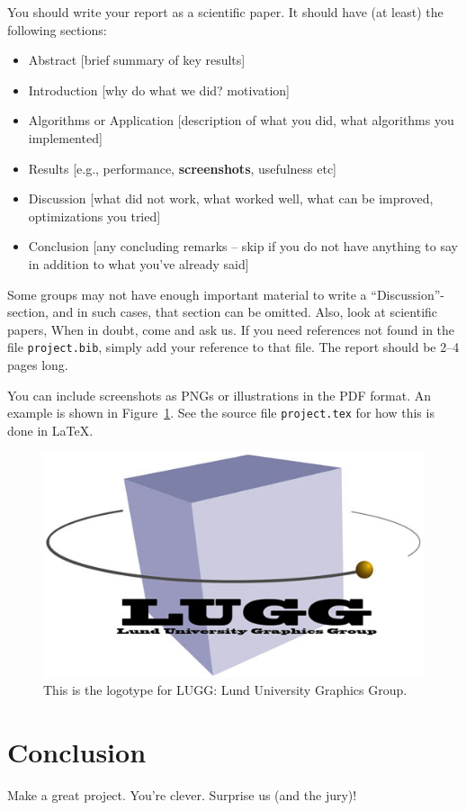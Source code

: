 \documentclass{acmsiggraph}               %
\begin{document}
You should write your report as a scientific paper. It should have (at least)
the following sections:
\begin{itemize}
    \item Abstract [brief summary of key results]
    \item Introduction [why do what we did? motivation]
    \item Algorithms or Application [description of what you did, what algorithms you implemented]
    \item Results [e.g., performance, \textbf{screenshots}, usefulness etc]
    \item Discussion [what did not work, what worked well, what can be improved, optimizations you tried]
    \item Conclusion [any concluding remarks -- skip if you do not have anything to say in addition to what you've already said]
\end{itemize}
Some groups may not have enough important material to write a ``Discussion''-section,
and in such cases, that section can be omitted. Also, look at scientific papers,
When in doubt, come and ask us.
If you need references not found in the file \texttt{project.bib}, simply add your reference to
that file. The report should be 2--4 pages long.

You can include screenshots as PNGs or illustrations in the PDF format.
An example is shown in Figure~\ref{fig_lugg}. See the source file \texttt{project.tex}
for how this is done in \LaTeX.
\begin{figure}[tb]
    \centering
    \includegraphics[width=0.7\columnwidth]{lugg.png}
    \caption{This is the logotype for LUGG: Lund University Graphics Group.}
    \label{fig_lugg}
\end{figure}

\section{Conclusion}
Make a great project. You're clever. Surprise us (and the jury)!



\end{document}
